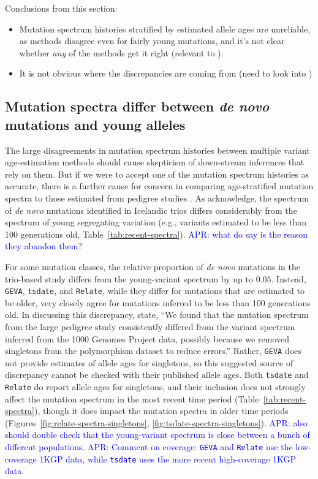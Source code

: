 \documentclass[]{article}
\newcommand{\aprcomment}[1]{{\textcolor{blue}{APR: #1}}}
\newcommand{\GEVA}{\texttt{GEVA}\xspace}
\newcommand{\tsdate}{\texttt{tsdate}\xspace}
\newcommand{\relate}{\texttt{Relate}\xspace}
\begin{document}
Conclusions from this section:
\begin{itemize}
    \item Mutation spectrum histories stratified by estimated allele ages are
        unreliable, as methods disagree even for fairly young mutations,
        and it's not clear whether \emph{any} of the methods get
        it right (relevant to \citet{gao2022limited}).
    \item It is not obvious where the discrepancies are coming from (need
        to look into \citet{brandt2022evaluation})
\end{itemize}

\subsection*{Mutation spectra differ between \emph{de novo} mutations and young
alleles}

The large disagreements in mutation spectrum histories between multiple variant
age-estimation methods should cause skepticism of down-stream inferences that
rely on them. But if we were to accept one of the mutation spectrum histories
as accurate, there is a further cause for concern in comparing age-stratified
mutation spectra to those estimated from pedigree studies
\citep{jonsson2017parental,halldorsson2019characterizing}. As
\citet{wang2023human} acknowledge, the spectrum of \emph{de novo} mutations
identified in Icelandic trios \citep{jonsson2017parental} differs considerably
from the spectrum of young segregating variation (e.g., variants estimated to
be less than 100 generations old, Table~\ref{tab:recent-spectra}).
\aprcomment{what do \citet{gao2022limited} say is the reason they abandon
them?}

For some mutation classes, the relative proportion of \emph{de novo} mutations
in the trio-based study differs from the young-variant spectrum by up to
$0.05$. Instead, \GEVA, \tsdate, and \relate, while they differ for mutations
that are estimated to be older, very closely agree for mutations inferred to be
less than 100 generations old. In discussing this discrepancy,
\citet{wang2023human} state, ``We found that the mutation spectrum from the
large pedigree study consistently differed from the variant spectrum inferred
from the 1000 Genomes Project data, possibly because we removed singletons from
the polymorphism dataset to reduce errors.'' Rather, \GEVA does not provide
estimates of allele ages for singletons, so this suggested source of
discrepancy cannot be checked with their published allele ages. Both \tsdate
and \relate do report allele ages for singletons, and their inclusion does not
strongly affect the mutation spectrum in the most recent time period
(Table~\ref{tab:recent-spectra}), though it does impact the mutation spectra in
older time periods (Figures~\ref{fig:relate-spectra-singletons},
\ref{fig:tsdate-spectra-singletons}). \aprcomment{also should double check that
the young-variant spectrum is close between a bunch of different populations.}
\aprcomment{Comment on coverage: \GEVA and \relate use the low-coverage 1KGP
data, while \tsdate uses the more recent high-coverage 1KGP data.}
\end{document}
